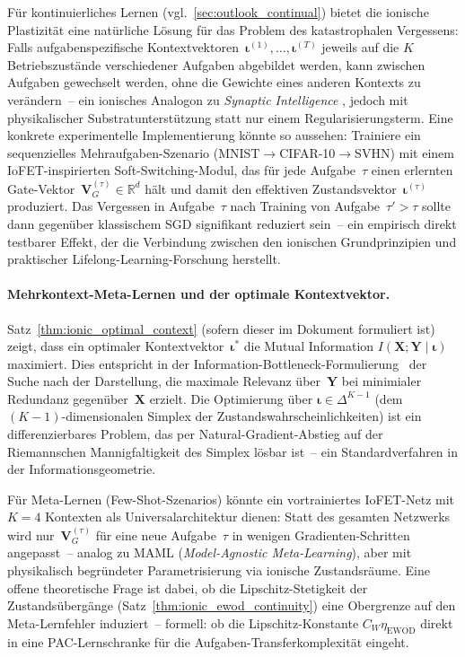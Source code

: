 ﻿\documentclass[12pt, a4paper, openany]{report}
\begin{document}
Für kontinuierliches Lernen (vgl.~\cref{sec:outlook_continual}) bietet die
ionische Plastizität eine natürliche Lösung für das Problem des katastrophalen
Vergessens: Falls aufgabenspezifische Kontextvektoren~$\bm{\iota}^{(1)}, \ldots,
\bm{\iota}^{(T)}$ jeweils auf die $K$ Betriebszustände verschiedener
Aufgaben abgebildet werden, kann zwischen Aufgaben gewechselt werden, ohne
die Gewichte eines anderen Kontexts zu verändern~-- ein ionisches Analogon
zu \emph{Synaptic Intelligence} \cite{zenke17}, jedoch mit physikalischer
Substratunterstützung statt nur einem Regularisierungsterm.
Eine konkrete experimentelle Implementierung könnte so aussehen: Trainiere
ein sequenzielles Mehraufgaben-Szenario (MNIST$\to$CIFAR-10$\to$SVHN) mit
einem IoFET-inspirierten Soft-Switching-Modul, das für jede Aufgabe~$\tau$
einen erlernten Gate-Vektor~$\mathbf{V}_G^{(\tau)} \in \mathbb{R}^d$ hält
und damit den effektiven Zustandsvektor~$\bm{\iota}^{(\tau)}$ produziert.
Das Vergessen in Aufgabe~$\tau$ nach Training von Aufgabe~$\tau'>\tau$ sollte
dann gegenüber klassischem SGD signifikant reduziert sein~-- ein empirisch
direkt testbarer Effekt, der die Verbindung zwischen den
ionischen Grundprinzipien und praktischer Lifelong-Learning-Forschung herstellt.

\paragraph{Mehrkontext-Meta-Lernen und der optimale Kontextvektor.}
Satz~\ref{thm:ionic_optimal_context} (sofern dieser im Dokument formuliert
ist) zeigt, dass ein optimaler Kontextvektor~$\bm{\iota}^*$
die Mutual Information $I(\bm{X};\bm{Y} \mid \bm{\iota})$ maximiert.  Dies
entspricht in der Information-Bottleneck-Formulierung~\cite{tishby15} der
Suche nach der Darstellung, die maximale Relevanz über~$\bm{Y}$ bei
minimialer Redundanz gegenüber~$\bm{X}$ erzielt.  Die Optimierung über
$\bm{\iota} \in \Delta^{K-1}$ (dem $(K-1)$-dimensionalen Simplex der
Zustandswahrscheinlichkeiten) ist ein differenzierbares Problem, das
per Natural-Gradient-Abstieg auf der Riemannschen Mannigfaltigkeit des
Simplex lösbar ist~-- ein Standardverfahren in der Informationsgeometrie.

Für Meta-Lernen (Few-Shot-Szenarios) könnte ein vortrainiertes IoFET-Netz
mit $K=4$ Kontexten als Universalarchitektur dienen: Statt des gesamten
Netzwerks wird nur~$\bm{V}_G^{(\tau)}$ für eine neue Aufgabe~$\tau$
in wenigen Gradienten-Schritten angepasst~-- analog zu MAML
(\textit{Model-Agnostic Meta-Learning}), aber mit physikalisch begründeter
Parametrisierung via ionische Zustandsräume.  Eine offene
theoretische Frage ist dabei, ob die Lipschitz-Stetigkeit der
Zustandsübergänge (Satz~\ref{thm:ionic_ewod_continuity}) eine Obergrenze
auf den Meta-Lernfehler induziert~-- formell: ob die Lipschitz-Konstante
$C_W \eta_{\text{EWOD}}$ direkt in eine PAC-Lernschranke für die
Aufgaben-Transferkomplexität eingeht.
\end{document}
